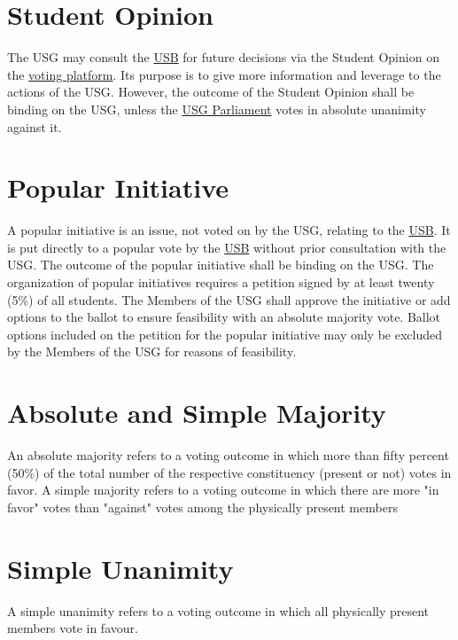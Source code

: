 \section{Student Opinion}
\label{StudentOpiniondef}
The USG may consult the \hyperref[studentbody]{USB} for future decisions via the Student Opinion on the \href{https://vote.jacobs.university/}{voting platform}. Its purpose is to give more information and leverage to the actions of the USG. However, the outcome of the Student Opinion shall be binding on the USG, unless the \hyperref[USGParliamentDef]{USG Parliament} votes in absolute unanimity against it.

\section{Popular Initiative} 
 A popular initiative is an issue, not voted on by the USG, relating to the \hyperref[studentbody]{USB}. It is put directly to a popular vote by the \hyperref[studentbody]{USB} without prior consultation with the USG. The outcome of the popular initiative shall be binding on the USG. The organization of popular initiatives requires a petition signed by at least twenty (5\%)  of all students. The Members of the USG shall approve the initiative or add options to the ballot to ensure feasibility with an absolute majority vote. Ballot options included on the petition for the popular initiative may only be excluded by the Members of the USG for reasons of feasibility.

\section{} 

\section{Absolute and Simple Majority}
An absolute majority refers to a voting outcome in which more than fifty percent (50\%) of the total number of the respective constituency (present or not) votes in favor.  A simple majority refers to a voting outcome in which there are more "in favor" votes than "against" votes among the physically present members

\section{Simple Unanimity}
A simple unanimity refers to a voting outcome in which all physically present members vote in favour.


